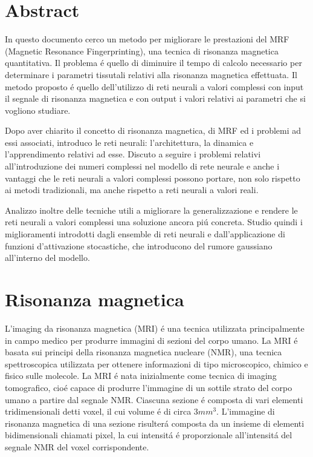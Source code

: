 \documentclass[a4paper,12pt]{report}
\begin{document}
 \chapter*{Abstract}
 
 In questo documento cerco un metodo per migliorare le prestazioni del MRF (Magnetic Resonance Fingerprinting), una tecnica di risonanza magnetica quantitativa. 
 Il problema \'e quello di diminuire il tempo di calcolo necessario per determinare i parametri tissutali relativi alla risonanza magnetica effettuata. 
 Il metodo proposto \'e quello dell'utilizzo di reti neurali a valori complessi con input il segnale di risonanza magnetica e con output i valori relativi ai parametri che si vogliono studiare. 
 
 Dopo aver chiarito il concetto di risonanza magnetica, di MRF ed i problemi ad essi associati, introduco le reti neurali: l'architettura, la dinamica e l'apprendimento relativi ad esse. 
 Discuto a seguire i problemi relativi all'introduzione dei numeri complessi nel modello di rete neurale e anche i vantaggi che le reti neurali a valori complessi possono portare, non solo rispetto ai metodi tradizionali, ma anche rispetto a reti neurali a valori reali.
 
 Analizzo inoltre delle tecniche utili a migliorare la generalizzazione e rendere le reti neurali a valori complessi una soluzione ancora pi\'u concreta. 
 Studio quindi i miglioramenti introdotti dagli ensemble di reti neurali e dall'applicazione di funzioni d'attivazione stocastiche, che introducono del rumore gaussiano all'interno del modello.
 
 \chapter*{Risonanza magnetica}
 
 L'imaging da risonanza magnetica (MRI) \'e una tecnica utilizzata principalmente in campo medico per produrre immagini di sezioni del corpo umano.
 La MRI \'e basata sui principi della risonanza magnetica nucleare (NMR), una tecnica spettroscopica utilizzata per ottenere informazioni di tipo microscopico, chimico e fisico sulle molecole.
 La MRI \'e nata inizialmente come tecnica di imaging tomografico, cio\'e capace di produrre l'immagine di un sottile strato del corpo umano a partire dal segnale NMR.
 Ciascuna sezione \'e composta di vari elementi tridimensionali detti voxel, il cui volume \'e di circa $3mm^3$. 
 L'immagine di risonanza magnetica di una sezione risulter\'a composta da un insieme di elementi bidimensionali chiamati pixel, la cui intensit\'a \'e proporzionale all'intensit\'a del segnale NMR del voxel corrispondente.
 
\end{document}
